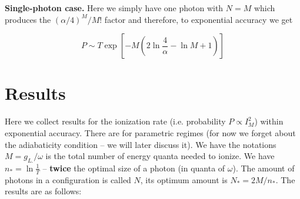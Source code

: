 \textbf{Single-photon case.} Here we simply have one photon with $N=M$
which produces the $(\alpha/4)^{M}/M!$ factor and therefore, to exponential
accuracy we get

\[
P\sim T\exp\left[-M\left(2\ln\frac{4}{\alpha}-\ln M+1\right)\right]
\]


\section{Results}

Here we collect results for the ionization rate (i.e. probability
$P\propto I_{M}^{2}$) within exponential accuracy. There are for
parametric regimes (for now we forget about the adiabaticity condition
-- we will later discuss it). We have the notations $M=g_{L.}/\omega$
is the total number of energy quanta needed to ionize. We have $n_{*}=\ln\frac{1}{T}$
-- \textbf{twice} the optimal size of a photon (in quanta of $\omega$).
The amount of photons in a configuration is called $N$, its optimum
amount is $N_{*}=2M/n_{*}$. The results are as follows:

